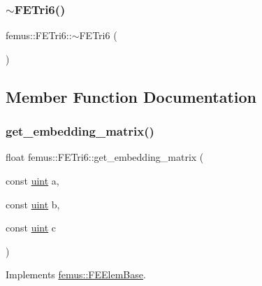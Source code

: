 \mbox{\label{classfemus_1_1_f_e_tri6_a38e0ee192d84fafe8530a8fbd0c4c1a9}} 
\subsubsection{\texorpdfstring{$\sim$\+F\+E\+Tri6()}{~FETri6()}}
{\footnotesize\ttfamily femus\+::\+F\+E\+Tri6\+::$\sim$\+F\+E\+Tri6 (\begin{DoxyParamCaption}{ }\end{DoxyParamCaption})}



\subsection{Member Function Documentation}
\mbox{\label{classfemus_1_1_f_e_tri6_ab279faaaec620922946e9a1119493607}} 
\subsubsection{\texorpdfstring{get\+\_\+embedding\+\_\+matrix()}{get\_embedding\_matrix()}}
{\footnotesize\ttfamily float femus\+::\+F\+E\+Tri6\+::get\+\_\+embedding\+\_\+matrix (\begin{DoxyParamCaption}\item[{const \mbox{\hyperlink{_typedefs_8hpp_a91ad9478d81a7aaf2593e8d9c3d06a14}{uint}}}]{a,  }\item[{const \mbox{\hyperlink{_typedefs_8hpp_a91ad9478d81a7aaf2593e8d9c3d06a14}{uint}}}]{b,  }\item[{const \mbox{\hyperlink{_typedefs_8hpp_a91ad9478d81a7aaf2593e8d9c3d06a14}{uint}}}]{c }\end{DoxyParamCaption})\hspace{0.3cm}{\ttfamily [virtual]}}



Implements \mbox{\hyperlink{classfemus_1_1_f_e_elem_base_a0c4d6d5ec66bd4e301eb8ea2ef10f354}{femus\+::\+F\+E\+Elem\+Base}}.


